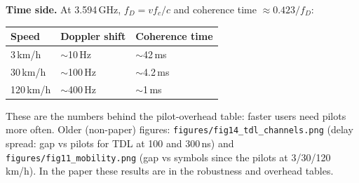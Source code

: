\documentclass[11pt,a4paper]{article}
\begin{document}
\textbf{Time side.} At 3.594\,GHz, $f_D=vf_c/c$ and coherence time $\approx0.423/f_D$:
\begin{center}\small
\begin{tabular}{lll}
\toprule
Speed & Doppler shift & Coherence time\\
\midrule
3\,km/h & $\sim$10\,Hz & $\sim$42\,ms\\
30\,km/h & $\sim$100\,Hz & $\sim$4.2\,ms\\
120\,km/h & $\sim$400\,Hz & $\sim$1\,ms\\
\bottomrule
\end{tabular}
\end{center}
These are the numbers behind the pilot-overhead table: faster users need pilots more often. Older (non-paper) figures:
\texttt{figures/fig14\_tdl\_channels.png} (delay spread: gap vs pilots for TDL at 100 and 300\,ns) and
\texttt{figures/fig11\_mobility.png} (gap vs symbols since the pilots at 3/30/120\,km/h). In the paper these results are in
the robustness and overhead tables.

\end{document}
